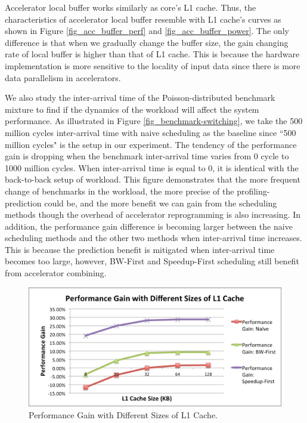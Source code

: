 Accelerator local buffer works similarly as core's L1 cache. Thus, the characteristics of accelerator local buffer resemble with L1 cache's curves as shown in Figure \ref{fig_acc_buffer_perf} and \ref{fig_acc_buffer_power}. The only difference is that when we gradually change the buffer size, the gain changing rate of local buffer is higher than that of L1 cache. This is because the hardware implementation is more sensitive to the locality of input data since there is more data parallelism in accelerators. 

We also study the inter-arrival time of the Poisson-distributed benchmark mixture to find if the dynamics of the workload will affect the system performance. As illustrated in Figure \ref{fig_benchmark-switching}, we take the 500 million cycles inter-arrival time with naive scheduling as the baseline since ``500 million cycles" is the setup in our experiment. The tendency of the performance gain is dropping when the benchmark inter-arrival time varies from 0 cycle to 1000 million cycles. When inter-arrival time is equal to 0, it is identical with the back-to-back setup of workload. This figure demonstrates that the more frequent change of benchmarks in the workload, the more precise of the profiling-prediction could be, and the more benefit we can gain from the scheduling methods though the overhead of accelerator reprogramming is also increasing. In addition, the performance gain difference is becoming larger between the naive scheduling methods and the other two methods when inter-arrival time increases. This is because the prediction benefit is mitigated when inter-arrival time becomes too large, however, BW-First and Speedup-First scheduling still benefit from accelerator combining. 

\begin{figure}
    \centering
    \includegraphics[width=4.5in]{L1-Cache-Performance}
    \caption{Performance Gain with Different Sizes of L1 Cache.}
    \label{fig_l1_perf}
\end{figure}

